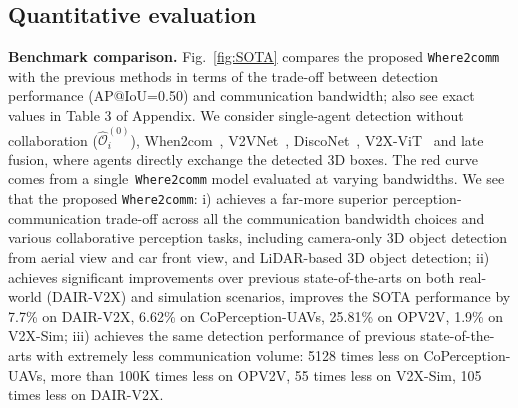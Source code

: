 
\vspace{-2mm}
\subsection{Quantitative evaluation}
\vspace{-2mm}




\textbf{Benchmark comparison.} Fig.~\ref{fig:SOTA} compares the proposed \texttt{Where2comm} with the previous methods in terms of the trade-off between detection performance (AP@IoU=0.50) and communication bandwidth; also see exact values in Table 3 of Appendix. We consider single-agent detection without collaboration ($\widehat{\mathcal{O}}_i^{(0)}$), When2com~\cite{when2com}, V2VNet~\cite{v2vnet}, DiscoNet~\cite{disconet}, V2X-ViT~\cite{xu2022v2x} and late fusion, where agents directly exchange the detected 3D boxes. The red curve comes from a single~\texttt{Where2comm} model evaluated at varying bandwidths. We see that the proposed \texttt{Where2comm}: i) achieves a far-more superior perception-communication trade-off across all the communication bandwidth choices and various collaborative perception tasks, including camera-only 3D object detection from aerial view and car front view, and LiDAR-based 3D object detection; ii) achieves significant improvements over previous state-of-the-arts on both real-world (DAIR-V2X) and simulation scenarios, improves the SOTA performance by 7.7\% on DAIR-V2X, 6.62\% on CoPerception-UAVs, 25.81\% on OPV2V, 1.9\% on V2X-Sim; iii) achieves the same detection performance of previous state-of-the-arts with extremely less communication volume: 5128 times less on CoPerception-UAVs, more than 100K times less on OPV2V, 55 times less on V2X-Sim, 105 times less on DAIR-V2X.



